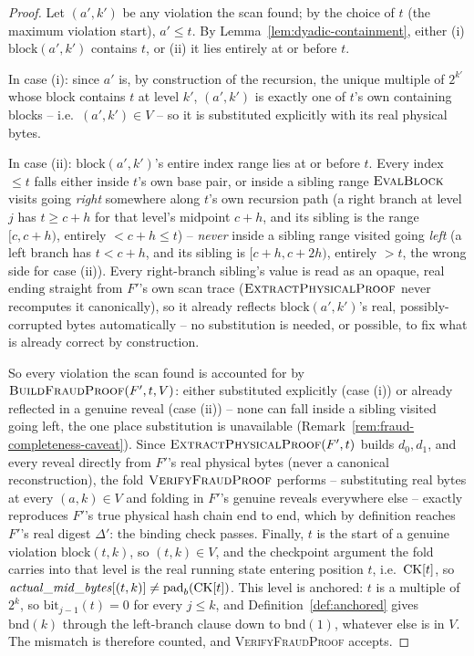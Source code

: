 \begin{proof}
Let $(a',k')$ be any violation the scan found; by the choice of $t$ (the
maximum violation start), $a' \le t$. By Lemma~\ref{lem:dyadic-containment},
either (i) $\mathrm{block}(a',k')$ contains $t$, or (ii) it lies entirely
at or before $t$.

In case (i): since $a'$ is, by construction of the recursion, the unique
multiple of $2^{k'}$ whose block contains $t$ at level $k'$, $(a',k')$ is
exactly one of $t$'s own containing blocks -- i.e.\ $(a',k') \in V$ -- so
it is substituted explicitly with its real physical bytes.

In case (ii): $\mathrm{block}(a',k')$'s entire index range lies at or
before $t$. Every index $\le t$ falls either inside $t$'s own base pair, or
inside a sibling range $\textsc{EvalBlock}$ visits going \emph{right}
somewhere along $t$'s own recursion path (a right branch at level $j$ has
$t \ge c+h$ for that level's midpoint $c+h$, and its sibling is the range
$[c, c+h)$, entirely $< c+h \le t$) -- \emph{never} inside a sibling range
visited going \emph{left} (a left branch has $t < c+h$, and its sibling is
$[c+h, c+2h)$, entirely $> t$, the wrong side for case (ii)). Every
right-branch sibling's value is read as an opaque, real $\mathrm{ending}$
straight from $F'$'s own scan trace ($\textsc{ExtractPhysicalProof}$ never
recomputes it canonically), so it already reflects
$\mathrm{block}(a',k')$'s real, possibly-corrupted bytes automatically --
no substitution is needed, or possible, to fix what is already correct by
construction.

So every violation the scan found is accounted for by
$\textsc{BuildFraudProof}(F',t,V)$: either substituted explicitly (case
(i)) or already reflected in a genuine reveal (case (ii)) -- none can fall
inside a sibling visited going left, the one place substitution is
unavailable (Remark~\ref{rem:fraud-completeness-caveat}). Since
$\textsc{ExtractPhysicalProof}(F',t)$ builds $d_0, d_1$, and every reveal
directly from $F'$'s real physical bytes (never a canonical
reconstruction), the fold $\textsc{VerifyFraudProof}$ performs --
substituting real bytes at every $(a,k) \in V$ and folding in $F'$'s
genuine reveals everywhere else -- exactly reproduces $F'$'s true physical
hash chain end to end, which by definition reaches $F'$'s real digest
$\Delta'$: the binding check passes. Finally, $t$ is the start of a
genuine violation $\mathrm{block}(t,k)$, so $(t,k) \in V$, and the
checkpoint argument the fold carries into that level is the real running
state entering position $t$, i.e.\ $\mathrm{CK}[t]$, so
$\mathit{actual\_mid\_bytes}[(t,k)] \ne \mathrm{pad}_b(\mathrm{CK}[t])$. This
level is anchored: $t$ is a multiple of $2^k$, so $\mathrm{bit}_{j-1}(t) =
0$ for every $j \le k$, and Definition~\ref{def:anchored} gives
$\mathrm{bnd}(k)$ through the left-branch clause down to
$\mathrm{bnd}(1)$, whatever else is in $V$. The mismatch is therefore
counted, and \textsc{VerifyFraudProof} accepts.
\end{proof}

